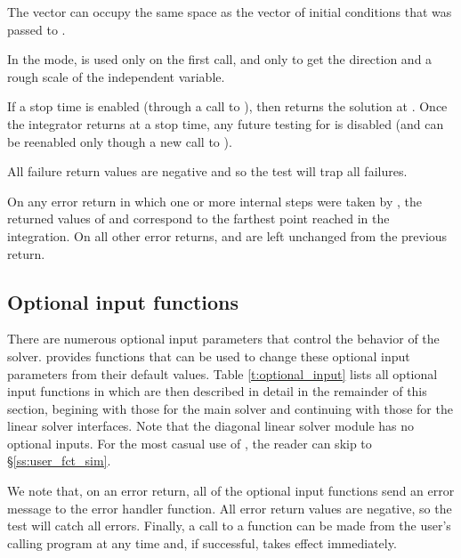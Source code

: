 {
  The vector  can occupy the same space as the vector  of
  initial conditions that was passed to .

  In the  mode,  is used only on the first call,
  and only to get the direction and a rough scale of the independent variable.

  If a stop time is enabled (through a call to ), then
   returns the solution at . Once the integrator returns
  at a stop time, any future testing for  is disabled (and can be
  reenabled only though a new call to ).

  All failure return values are negative and so the test 
  will trap all  failures.

  On any error return in which one or more internal steps were taken by
  , the returned values of  and  correspond to
  the farthest point reached in the integration.  On all other error returns,
   and  are left unchanged from the previous 
  return.

}

\subsection{Optional input functions}\label{ss:optional_input}

There are numerous optional input parameters that control the behavior
of the {\cvodes} solver.  {\cvodes} provides functions that can be used to change
these optional input parameters from their default values.
Table \ref{t:optional_input} lists all optional input functions in {\cvodes} which
are then described in detail in the remainder of this section, begining with those
for the main {\cvodes} solver and continuing with those for the linear
solver interfaces.  Note that the diagonal linear solver module has no
optional inputs.  For the most casual use of {\cvodes}, the reader
can skip to \S\ref{ss:user_fct_sim}.

We note that, on an error return, all of the optional input functions send an
error message to the error handler function.
All error return values are negative, so the test  will catch all
errors. Finally, a call to a  function can be made from the
user's calling program at any time and, if successful, takes effect immediately.

